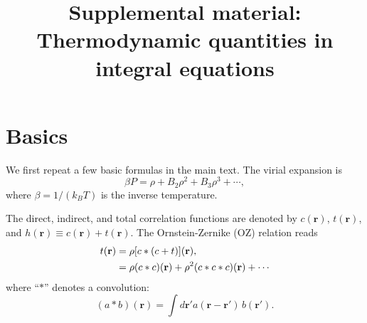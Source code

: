 \documentclass[notitlepage,preprint]{revtex4-1}
\newcommand{\vct}[1]{\mathbf{#1}}
\providecommand{\vr}{} %
\renewcommand{\vr}{\vct{r}}
\begin{document}
\title{Supplemental material: Thermodynamic quantities in integral equations}


\maketitle






\section{Basics}

We first repeat a few basic formulas in the main text.
%
The virial expansion is
%
\begin{equation}
  \beta P = \rho + B_2 \rho^2 + B_3 \rho^3 + \cdots,
\label{eq:virial}
\end{equation}
%
where $\beta = 1/(k_B T)$ is the inverse temperature.

The direct, indirect, and total correlation functions
  are denoted by $c(\vr)$, $t(\vr)$,
  and $h(\vr) \equiv c(\vr) + t(\vr)$.
%
The Ornstein-Zernike (OZ) relation\cite{hansen} reads
%
\begin{align}
  t(\vr) &= \rho [c * (c + t)](\vr), \notag \\
         &= \rho (c*c)(\vr) + \rho^2 (c*c*c)(\vr) + \cdots
\label{eq:oz}
\end{align}
%
where ``$*$'' denotes a convolution:
\begin{equation}
  (a * b)(\vr) = \int d\vr' a(\vr - \vr') \, b(\vr').
\label{eq:convol}
\end{equation}
%
\end{document}
